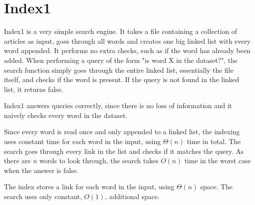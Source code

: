 \section{Index1}

Index1 is a very simple search engine. It takes a file containing a collection of articles as input, goes through all words and creates one big linked list with every word appended. It performs no extra checks, such as if the word has already been added. When performing a query of the form "is word X in the dataset?", the search function simply goes through the entire linked list, essentially the file itself, and checks if the word is present. If the query is not found in the linked list, it returns false. 

Index1 answers queries correctly, since there is no loss of information and it naively checks every word in the dataset. 

Since every word is read once and only appended to a linked list, the indexing uses constant time for each word in the input, using $\Theta(n)$ time in total. The search goes through every link in the list and checks if it matches the query. As there are $n$ words to look through, the search takes $O(n)$ time in the worst case when the answer is false. 

The index stores a link for each word in the input, using $\Theta(n)$ space. The search uses only constant, $O(1)$, additional space. 

